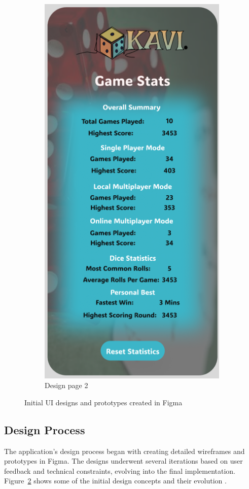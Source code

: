 \begin{figure}[h]
\begin{subfigure}[b]{0.48\textwidth}
        \includegraphics[scale=0.45]{img/stats.png}
        \caption{Design page 2}
        \label{fig:figma_design2}
    \end{subfigure}
    \caption{Initial UI designs and prototypes created in Figma}
    \label{fig:figma_designs}
\end{figure}

\subsection{Design Process}
The application's design process began with creating detailed wireframes and prototypes in Figma. The designs underwent several iterations based on user feedback and technical constraints, evolving into the final implementation. Figure~\ref{fig:figma_designs} shows some of the initial design concepts and their evolution \cite{bib:kavifigma}.

